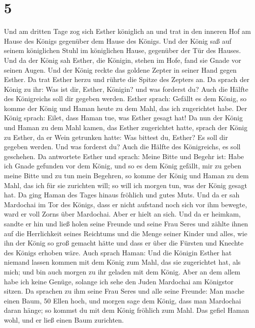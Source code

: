 \hypertarget{section-4}{%
\section{5}\label{section-4}}

 Und am dritten Tage zog sich Esther königlich an und trat
in den inneren Hof am Hause des Königs gegenüber dem Hause des Königs.
Und der König saß auf seinem königlichen Stuhl im königlichen Hause,
gegenüber der Tür des Hauses.  Und da der König sah
Esther, die Königin, stehen im Hofe, fand sie Gnade vor seinen Augen.
Und der König reckte das goldene Zepter in seiner Hand gegen Esther. Da
trat Esther herzu und rührte die Spitze des Zepters an. 
Da sprach der König zu ihr: Was ist dir, Esther, Königin? und was
forderst du? Auch die Hälfte des Königreichs soll dir gegeben werden.
 Esther sprach: Gefällt es dem König, so komme der König
und Haman heute zu dem Mahl, das ich zugerichtet habe. 
Der König sprach: Eilet, dass Haman tue, was Esther gesagt hat! Da nun
der König und Haman zu dem Mahl kamen, das Esther zugerichtet hatte,
 sprach der König zu Esther, da er Wein getrunken hatte:
Was bittest du, Esther? Es soll dir gegeben werden. Und was forderst du?
Auch die Hälfte des Königreichs, es soll geschehen.  Da
antwortete Esther und sprach: Meine Bitte und Begehr ist: 
Habe ich Gnade gefunden vor dem König, und so es dem König gefällt, mir
zu geben meine Bitte und zu tun mein Begehren, so komme der König und
Haman zu dem Mahl, das ich für sie zurichten will; so will ich morgen
tun, was der König gesagt hat.  Da ging Haman des Tages
hinaus fröhlich und gutes Muts. Und da er sah Mardochai im Tor des
Königs, dass er nicht aufstand noch sich vor ihm bewegte, ward er voll
Zorns über Mardochai.  Aber er hielt an sich. Und da er
heimkam, sandte er hin und ließ holen seine Freunde und seine Frau Seres
 und zählte ihnen auf die Herrlichkeit seines Reichtums
und die Menge seiner Kinder und alles, wie ihn der König so groß gemacht
hätte und dass er über die Fürsten und Knechte des Königs erhoben wäre.
 Auch sprach Haman: Und die Königin Esther hat niemand
lassen kommen mit dem König zum Mahl, das sie zugerichtet hat, als mich;
und bin auch morgen zu ihr geladen mit dem König.  Aber
an dem allem habe ich keine Genüge, solange ich sehe den Juden Mardochai
am Königstor sitzen.  Da sprachen zu ihm seine Frau Seres
und alle seine Freunde: Man mache einen Baum, 50 Ellen hoch, und morgen
sage dem König, dass man Mardochai daran hänge; so kommst du mit dem
König fröhlich zum Mahl. Das gefiel Haman wohl, und er ließ einen Baum
zurichten.

